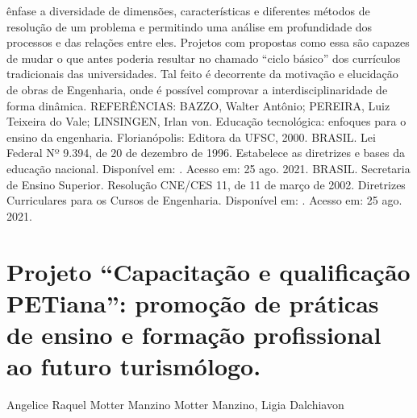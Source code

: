 ênfase a diversidade de dimensões, características e diferentes métodos de resolução de um 
problema e permitindo uma análise em profundidade dos processos e das relações entre eles. 
Projetos com propostas como essa são capazes de mudar o que antes poderia resultar no chamado 
“ciclo básico” dos currículos tradicionais das universidades. Tal feito é decorrente da motivação e 
elucidação de obras de Engenharia, onde é possível comprovar a interdisciplinaridade de forma 
dinâmica.
REFERÊNCIAS:
BAZZO, Walter Antônio; PEREIRA, Luiz Teixeira do Vale; LINSINGEN, Irlan von. Educação 
tecnológica: enfoques para o ensino da engenharia. Florianópolis: Editora da UFSC, 2000.
BRASIL. Lei Federal Nº 9.394, de 20 de dezembro de 1996. Estabelece as diretrizes e bases da 
educação nacional. Disponível em: .
Acesso em: 25 ago. 2021.
BRASIL. Secretaria de Ensino Superior. Resolução CNE/CES 11, de 11 de março de 2002. 
Diretrizes Curriculares para os Cursos de Engenharia. Disponível em:
. Acesso em: 25 ago. 2021.



\section{Projeto “Capacitação e qualificação PETiana”: promoção de práticas de ensino e formação  profissional ao futuro turismólogo. }

Angelice Raquel Motter Manzino Motter Manzino, Ligia Dalchiavon

